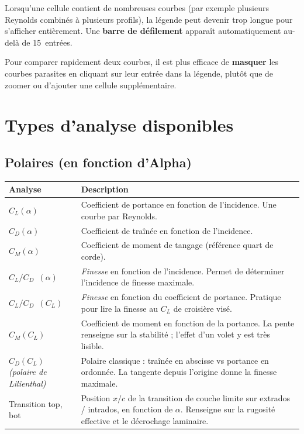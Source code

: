 Lorsqu'une cellule contient de nombreuses courbes (par exemple
plusieurs Reynolds combinés à plusieurs profils), la légende peut
devenir trop longue pour s'afficher entièrement. Une \textbf{barre
de défilement} apparaît automatiquement au-delà de 15~entrées.

\begin{astuce}
Pour comparer rapidement deux courbes, il est plus efficace
de \textbf{masquer} les courbes parasites en cliquant sur leur
entrée dans la légende, plutôt que de zoomer ou d'ajouter
une cellule supplémentaire.
\end{astuce}

\section{Types d'analyse disponibles}

\subsection{Polaires (en fonction d'Alpha)}

\begin{tabularx}{\linewidth}{l X}
    \toprule
    \textbf{Analyse} & \textbf{Description} \\
    \midrule
    $C_L(\alpha)$  & Coefficient de portance en fonction de
                     l'incidence. Une courbe par Reynolds.\\
    $C_D(\alpha)$  & Coefficient de traînée en fonction de
                     l'incidence.\\
    $C_M(\alpha)$  & Coefficient de moment de tangage
                     (référence quart de corde).\\
    $C_L/C_D$~$(\alpha)$ & \emph{Finesse} en fonction de
                     l'incidence. Permet de déterminer
                     l'incidence de finesse maximale.\\
    $C_L/C_D$~$(C_L)$ & \emph{Finesse} en fonction du coefficient de
                     portance. Pratique pour lire la finesse au
                     $C_L$ de croisière visé.\\
    $C_M(C_L)$     & Coefficient de moment en fonction de la
                     portance. La pente renseigne sur la stabilité ;
                     l'effet d'un volet y est très lisible.\\
    $C_D(C_L)$ \emph{(polaire de Lilienthal)}
                   & Polaire classique : traînée en abscisse
                     vs portance en ordonnée. La tangente
                     depuis l'origine donne la finesse maximale.\\
    Transition top, bot
                   & Position $x/c$ de la transition de couche
                     limite sur extrados / intrados, en fonction
                     de $\alpha$. Renseigne sur la rugosité
                     effective et le décrochage laminaire.\\
    \bottomrule
\end{tabularx}

